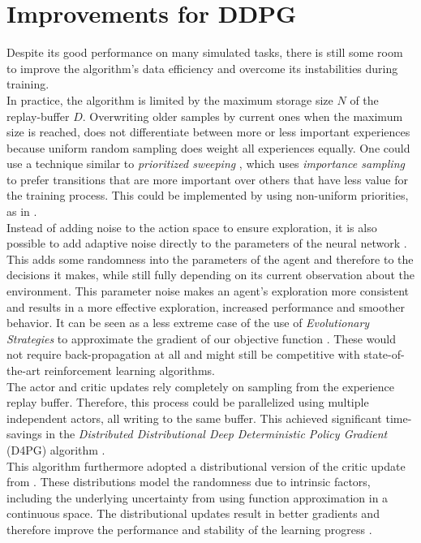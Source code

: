 \section{Improvements for DDPG}
\label{sec:improvements}
Despite its good performance on many simulated tasks, there is still some room to improve the algorithm's data efficiency and overcome its instabilities during training.\\
In practice, the algorithm is limited by the maximum storage size $\mathit{N}$ of the replay-buffer $\mathit{D}$. Overwriting older samples by current ones when the maximum size is reached, does not differentiate between more or less important experiences because uniform random sampling does weight all experiences equally. One could use a technique similar to \textit{prioritized sweeping} \citep{moore1993prioritized}, which uses \textit{importance sampling} \citep{glynn1989importance} to prefer transitions that are more important over others that have less value for the training process. This could be implemented by using non-uniform priorities, as in \citep{schaul2015prioritized,barth2018distributed}.\\
Instead of adding noise to the action space to ensure exploration, it is also possible to add adaptive noise directly to the parameters of the neural network \citep{plappert2017parameter}. This adds some randomness into the parameters of the agent and therefore to the decisions it makes, while still fully depending on its current observation about the environment. This parameter noise makes an agent's exploration more consistent and results in a more effective exploration, increased performance and smoother behavior. 
It can be seen as a less extreme case of the use of \textit{Evolutionary Strategies} to approximate the gradient of our objective function \citep{salimans2017evolution}. These would not require back-propagation at all and might still be competitive with state-of-the-art reinforcement learning algorithms.\\
The actor and critic updates rely completely on sampling from the experience replay buffer. Therefore, this process could be parallelized using multiple independent actors, all writing to the same buffer. This achieved significant time-savings in the \textit{Distributed Distributional Deep Deterministic Policy Gradient} (D4PG) algorithm  \citep{barth2018distributed}.\\
This algorithm furthermore adopted a distributional version of the critic update from \citep{bellemare2017distributional}. These distributions model the randomness due to intrinsic factors, including the underlying uncertainty from using function approximation in a continuous space. The distributional updates result in better gradients and therefore improve the performance and stability of the learning progress \citep{barth2018distributed}.\\
